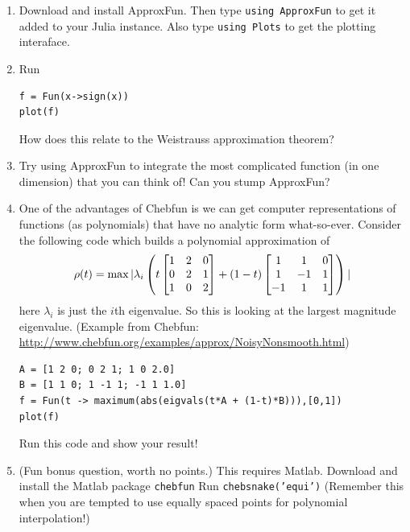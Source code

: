 \documentclass[]{article}
\begin{document}
\begin{enumerate}
\def\labelenumi{\arabic{enumi}.}
\item
  Download and install ApproxFun. Then type \texttt{using ApproxFun} to
  get it added to your Julia instance. Also type \texttt{using Plots} to
  get the plotting interaface.
\item
  Run

\begin{verbatim}
f = Fun(x->sign(x))
plot(f)
\end{verbatim}

  How does this relate to the Weistrauss approximation theorem?
\item
  Try using ApproxFun to integrate the most complicated function (in one
  dimension) that you can think of! Can you stump ApproxFun?
\item
  One of the advantages of Chebfun is we can get computer
  representations of functions (as polynomials) that have no analytic
  form what-so-ever. Consider the following code which builds a
  polynomial approximation of
  \[ \rho(t) = \max |\lambda_i\left( t \begin{bmatrix} 1 & 2 & 0 \\ 0 & 2 & 1 \\ 1 & 0 & 2 \end{bmatrix} + 
                      (1-t) \begin{bmatrix} 1 & 1 & 0 \\ 1 & -1 & 1 \\ -1 & 1 & 1 \end{bmatrix} \right) | \]
  here $\lambda_i$ is just the $i$th eigenvalue. So this is looking at
  the largest magnitude eigenvalue. (Example from Chebfun:
  \url{http://www.chebfun.org/examples/approx/NoisyNonsmooth.html})

\begin{verbatim}
A = [1 2 0; 0 2 1; 1 0 2.0]
B = [1 1 0; 1 -1 1; -1 1 1.0]
f = Fun(t -> maximum(abs(eigvals(t*A + (1-t)*B))),[0,1])   
plot(f)
\end{verbatim}

  Run this code and show your result!
\item
  (Fun bonus question, worth no points.) This requires Matlab. Download
  and install the Matlab package \texttt{chebfun} Run
  \texttt{chebsnake('equi')} (Remember this when you are tempted to use
  equally spaced points for polynomial interpolation!)
\end{enumerate}
\end{document}
